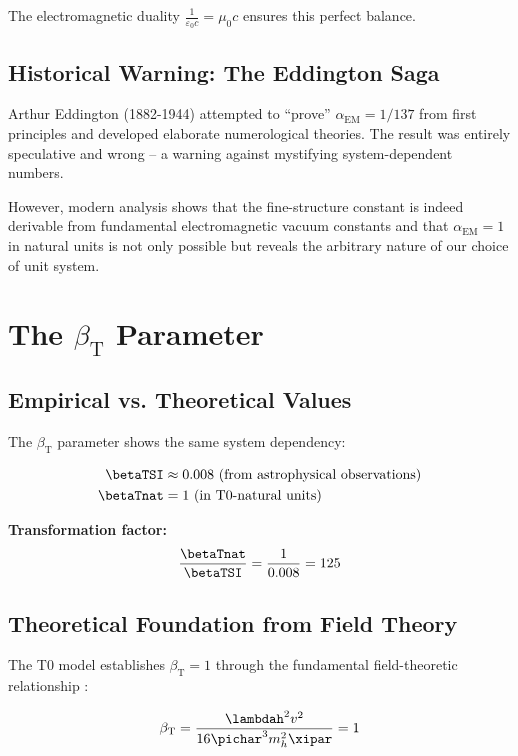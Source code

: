 The electromagnetic duality $\frac{1}{\varepsilon_0 c} = \mu_0 c$ ensures this perfect balance.

\subsection{Historical Warning: The Eddington Saga}
\label{subsec:eddington_warning}

Arthur Eddington (1882-1944) attempted to ``prove'' $\alpha_{\text{EM}} = 1/137$ from first principles and developed elaborate numerological theories. The result was entirely speculative and wrong -- a warning against mystifying system-dependent numbers.

However, modern analysis shows that the fine-structure constant is indeed derivable from fundamental electromagnetic vacuum constants and that $\alpha_{\text{EM}} = 1$ in natural units is not only possible but reveals the arbitrary nature of our choice of unit system.
	\section{The $\beta_{\text{T}}$ Parameter}
	\label{sec:beta_t}
	
	\subsection{Empirical vs. Theoretical Values}
	\label{subsec:beta_empirical_theoretical}
	
	The $\beta_{\text{T}}$ parameter shows the same system dependency:
	
	\begin{align}
		\betaTSI &\approx 0.008 \text{ (from astrophysical observations)} \\
		\betaTnat &= 1 \text{ (in T0-natural units)}
	\end{align}
	
	\textbf{Transformation factor:}
	$$\frac{\betaTnat}{\betaTSI} = \frac{1}{0.008} = 125$$
	
	\subsection{Theoretical Foundation from Field Theory}
	\label{subsec:beta_field_theory}
	
	The T0 model establishes $\beta_{\text{T}} = 1$ through the fundamental field-theoretic relationship \cite{pascher_derivation_beta_2025}:
	
	\begin{equation}
		\beta_{\text{T}} = \frac{\lambdah^2 v^2}{16\pichar^3 m_h^2 \xipar} = 1
		\label{eq:beta_t_field_theory}
	\end{equation}
	
